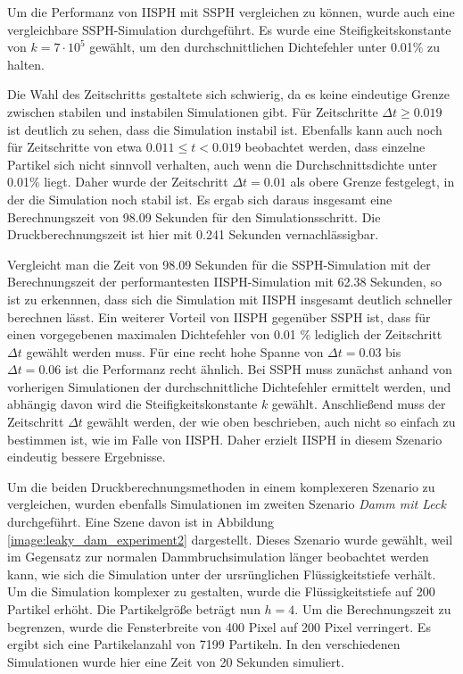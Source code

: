 \documentclass[11pt,
a4paper,
parskip=half, %
BCOR=10mm, %
english,
ngerman]{scrreprt}
\begin{document}
Um die Performanz von IISPH mit SSPH vergleichen zu können, wurde auch eine vergleichbare SSPH-Simulation durchgeführt.
Es wurde eine Steifigkeitskonstante von $k = 7 \cdot 10^5$ gewählt, um den durchschnittlichen Dichtefehler unter 0.01\% zu halten.

Die Wahl des Zeitschritts gestaltete sich schwierig, da es keine eindeutige Grenze zwischen stabilen und instabilen Simulationen gibt.
Für Zeitschritte $\Delta t \geq 0.019$ ist deutlich zu sehen, dass die Simulation instabil ist.
Ebenfalls kann auch noch für Zeitschritte von etwa $0.011 \leq t < 0.019$ beobachtet werden, dass einzelne Partikel sich nicht sinnvoll verhalten,
auch wenn die Durchschnittsdichte unter 0.01\% liegt.
Daher wurde der Zeitschritt $\Delta t = 0.01$ als obere Grenze festgelegt, in der die Simulation noch stabil ist.
Es ergab sich daraus insgesamt eine Berechnungszeit von 98.09 Sekunden für den Simulationsschritt.
Die Druckberechnungszeit ist hier mit 0.241 Sekunden vernachlässigbar.

Vergleicht man die Zeit von 98.09 Sekunden für die SSPH-Simulation mit der Berechnungszeit der performantesten IISPH-Simulation mit 62.38 Sekunden,
so ist zu erkennnen, dass sich die Simulation mit IISPH insgesamt deutlich schneller berechnen lässt.
Ein weiterer Vorteil von IISPH gegenüber SSPH ist,
dass für einen vorgegebenen maximalen Dichtefehler von 0.01 \% lediglich der Zeitschritt $\Delta t$ gewählt werden muss.
Für eine recht hohe Spanne von $\Delta t = 0.03$ bis $\Delta t = 0.06$ ist die Performanz recht ähnlich.
Bei SSPH muss zunächst anhand von vorherigen Simulationen der durchschnittliche Dichtefehler ermittelt werden,
und abhängig davon wird die Steifigkeitskonstante $k$ gewählt.
Anschließend muss der Zeitschritt $\Delta t$ gewählt werden, der wie oben beschrieben, auch nicht so einfach zu bestimmen ist, wie im Falle von IISPH.
Daher erzielt IISPH in diesem Szenario eindeutig bessere Ergebnisse.


Um die beiden Druckberechnungsmethoden in einem komplexeren Szenario zu vergleichen,
wurden ebenfalls Simulationen im zweiten Szenario \textit{Damm mit Leck} durchgeführt.
Eine Szene davon ist in Abbildung \ref{image:leaky_dam_experiment2} dargestellt.
Dieses Szenario wurde gewählt, weil im Gegensatz zur normalen Dammbruchsimulation länger beobachtet werden kann,
wie sich die Simulation unter der ursrünglichen Flüssigkeitstiefe verhält.
Um die Simulation komplexer zu gestalten, wurde die Flüssigkeitstiefe auf 200 Partikel erhöht.
Die Partikelgröße beträgt nun $h = 4$.
Um die Berechnungszeit zu begrenzen, wurde die Fensterbreite von 400 Pixel auf 200 Pixel verringert.
Es ergibt sich eine Partikelanzahl von 7199 Partikeln.
In den verschiedenen Simulationen wurde hier eine Zeit von 20 Sekunden simuliert.
\end{document}
